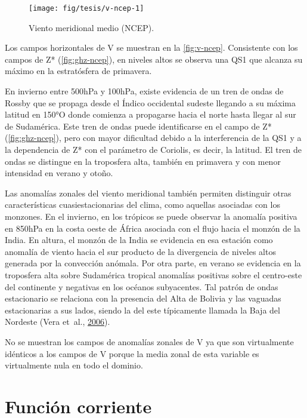 \documentclass[spanish,a4paper,12pt,oneside]{book}
\begin{document}
\begin{landscape}\begin{figure}

{\centering \texttt{[image: fig/tesis/v-ncep-1]} 

}

\caption{Viento meridional medio (NCEP).}\label{fig:v-ncep}
\end{figure}
\end{landscape}

Los campos horizontales de V se muestran en la \autoref{fig:v-ncep}.
Consistente con los campos de Z* (\autoref{fig:ghz-ncep}), en niveles
altos se observa una QS1 que alcanza su máximo en la estratósfera de
primavera.

En invierno entre 500hPa y 100hPa, existe evidencia de un tren de ondas
de Rossby que se propaga desde el Índico occidental sudeste llegando a
su máxima latitud en 150°O donde comienza a propagarse hacia el norte
hasta llegar al sur de Sudamérica. Este tren de ondas puede
identificarse en el campo de Z* (\autoref{fig:ghz-ncep}), pero con mayor
dificultad debido a la interferencia de la QS1 y a la dependencia de Z*
con el parámetro de Coriolis, es decir, la latitud. El tren de ondas se
distingue en la troposfera alta, también en primavera y con menor
intensidad en verano y otoño.

Las anomalías zonales del viento meridional también permiten distinguir
otras características cuasiestacionarias del clima, como aquellas
asociadas con los monzones. En el invierno, en los trópicos se puede
observar la anomalía positiva en 850hPa en la costa oeste de África
asociada con el flujo hacia el monzón de la India. En altura, el monzón
de la India se evidencia en esa estación como anomalía de viento hacia
el sur producto de la divergencia de niveles altos generada por la
convección anómala. Por otra parte, en verano se evidencia en la
troposfera alta sobre Sudamérica tropical anomalías positivas sobre el
centro-este del continente y negativas en los océanos subyacentes. Tal
patrón de ondas estacionario se relaciona con la presencia del Alta de
Bolivia y las vaguadas estacionarias a sus lados, siendo la del este
típicamente llamada la Baja del Nordeste (Vera et~al.,
\protect\hyperlink{ref-Vera2006}{2006}).

No se muestran los campos de anomalías zonales de V ya que son
virtualmente idénticos a los campos de V porque la media zonal de esta
variable es virtualmente nula en todo el dominio.

\section{Función corriente}\label{funcion-corriente}
\end{document}
